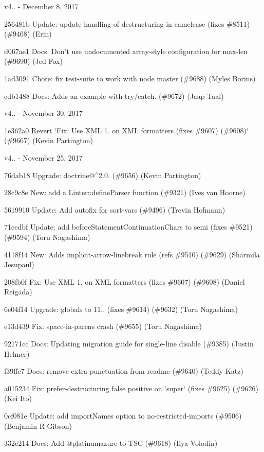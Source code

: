 v4.. -\/ December 8, 2017


\begin{DoxyItemize}
\item 256481b Update\+: update handling of destructuring in camelcase (fixes \#8511) (\#9468) (Erin)
\item d067ae1 Docs\+: Don’t use undocumented array-\/style configuration for max-\/len (\#9690) (Jed Fox)
\item 1ad3091 Chore\+: fix test-\/suite to work with node master (\#9688) (Myles Borins)
\item cdb1488 Docs\+: Adds an example with try/catch. (\#9672) (Jaap Taal)
\end{DoxyItemize}

v4.. -\/ November 30, 2017


\begin{DoxyItemize}
\item 1e362a0 Revert \char`\"{}\+Fix\+: Use X\+M\+L 1. on X\+M\+L formatters (fixes \#9607) (\#9608)\char`\"{} (\#9667) (Kevin Partington)
\end{DoxyItemize}

v4.. -\/ November 25, 2017


\begin{DoxyItemize}
\item 76dab18 Upgrade\+: doctrine@$^\wedge$2.0. (\#9656) (Kevin Partington)
\item 28c9c8e New\+: add a Linter\+::define\+Parser function (\#9321) (Ives van Hoorne)
\item 5619910 Update\+: Add autofix for {\ttfamily sort-\/vars} (\#9496) (Trevin Hofmann)
\item 71eedbf Update\+: add {\ttfamily before\+Statement\+Continuation\+Chars} to semi (fixes \#9521) (\#9594) (Toru Nagashima)
\item 4118f14 New\+: Adds implicit-\/arrow-\/linebreak rule (refs \#9510) (\#9629) (Sharmila Jesupaul)
\item 208fb0f Fix\+: Use X\+ML 1. on X\+ML formatters (fixes \#9607) (\#9608) (Daniel Reigada)
\item 6e04f14 Upgrade\+: {\ttfamily globals} to 11.. (fixes \#9614) (\#9632) (Toru Nagashima)
\item e13d439 Fix\+: space-\/in-\/parens crash (\#9655) (Toru Nagashima)
\item 92171cc Docs\+: Updating migration guide for single-\/line disable (\#9385) (Justin Helmer)
\item f39ffe7 Docs\+: remove extra punctuation from readme (\#9640) (Teddy Katz)
\item a015234 Fix\+: prefer-\/destructuring false positive on \char`\"{}super\char`\"{} (fixes \#9625) (\#9626) (Kei Ito)
\item 0cf081e Update\+: add import\+Names option to no-\/restricted-\/imports (\#9506) (Benjamin R Gibson)
\item 332c214 Docs\+: Add @platinumazure to T\+SC (\#9618) (Ilya Volodin)
\end{DoxyItemize}

